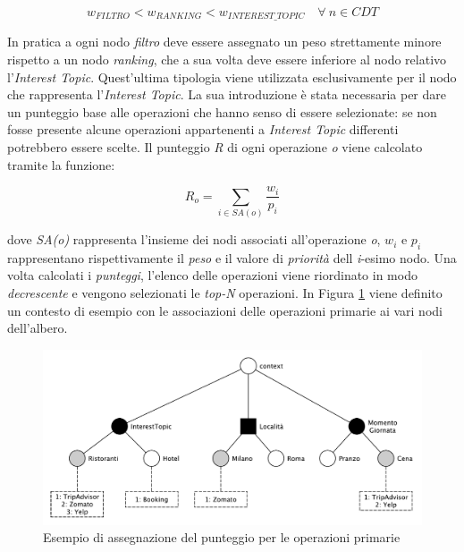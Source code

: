 \begin{equation*}
w_{FILTRO} < w_{RANKING} < w_{INTEREST\_TOPIC} \quad \forall\ n \in CDT
\end{equation*}

In pratica a ogni nodo \emph{filtro} deve essere assegnato un peso strettamente minore rispetto a un nodo \emph{ranking}, che a sua volta deve essere inferiore al nodo relativo l'\emph{Interest Topic}. Quest'ultima tipologia viene utilizzata esclusivamente per il nodo che rappresenta l'\emph{Interest Topic}. La sua introduzione è stata necessaria per dare un punteggio base alle operazioni che hanno senso di essere selezionate: se non fosse presente alcune operazioni appartenenti a \emph{Interest Topic} differenti potrebbero essere scelte. Il punteggio \emph{R} di ogni operazione \emph{o} viene calcolato tramite la funzione:

\begin{equation}\label{eq:primary-service-formula}
R_o = \sum_{i \in SA(o)}{\frac{w_i}{p_i}}
\end{equation}

dove \emph{SA(o)} rappresenta l'insieme dei nodi associati all'operazione \emph{o}, $ w_i $ e $ p_i $ rappresentano rispettivamente il \emph{peso} e il valore di \emph{priorità} dell \emph{i}-esimo nodo. Una volta calcolati i \emph{punteggi}, l'elenco delle operazioni viene riordinato in modo \emph{decrescente} e vengono selezionati le \emph{top-N} operazioni. In Figura \ref{fig:esempio-punteggio-primari} viene definito un contesto di esempio con le associazioni delle operazioni primarie ai vari nodi dell'albero.

\begin{figure}[ht]
	\centering
	\includegraphics[width=\textwidth]{3-metodologia-camus/Immagini/esempio-punteggio-primari.pdf}
	\caption{Esempio di assegnazione del punteggio per le operazioni primarie}\label{fig:esempio-punteggio-primari}
\end{figure}

